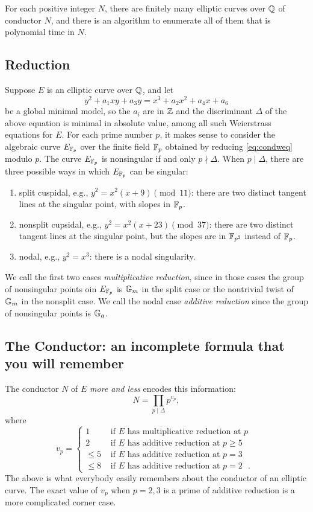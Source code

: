 \documentclass{book}
\begin{document}
\begin{theorem}
For each positive integer $N$,
there are finitely many elliptic curves over $\mathbb{Q}$
of conductor $N$, and there is an algorithm
to enumerate all of them that is polynomial
time in $N$.
\end{theorem}

\subsection{Reduction}
Suppose $E$ is an elliptic curve over $\mathbb{Q}$, and let
\begin{equation}\label{eq:condweq}
y^2 + a_1 xy + a_3 y = x^3 + a_2 x^2 + a_4 x + a_6
\end{equation}
be a global minimal model, so the $a_i$ are in $\mathbb{Z}$
and the discriminant $\Delta$ of the above equation is minimal
in absolute value, among all such Weierstrass equations for $E$.
For each prime number $p$, it makes sense to consider
the algebraic curve $E_{\mathbb{F}_p}$ over the finite field
$\mathbb{F}_p$ obtained by reducing \eqref{eq:condweq} modulo $p$.
The curve $E_{\mathbb{F}_p}$ is nonsingular if and only $p\nmid \Delta$.
When $p\mid \Delta$, there are three possible ways in which
$E_{\mathbb{F}_p}$ can be singular:
\begin{enumerate}
\item split cuspidal, e.g., $y^2=x^2(x+9)\pmod{11}$: there are two distinct
tangent lines at the singular point, with slopes in $\mathbb{F}_p$.
\item nonsplit cupsidal, e.g., $y^2=x^2(x+23) \pmod{37}$: there are two distinct tangent lines
at the singular point, but the slopes are in $\mathbb{F}_{p^2}$ instead
of $\mathbb{F}_p$.
\item nodal, e.g., $y^2=x^3$: there is a nodal singularity.
\end{enumerate}
We call the first two cases {\em multiplicative reduction}, since in those
cases the group of nonsingular points oin $E_{\mathbb{F}_p}$ is $\mathbb{G}_m$ in
the split case or the nontrivial twist of $\mathbb{G}_m$ in the nonsplit case.
We call the nodal case {\em additive reduction} since the group of nonsingular points is $\mathbb{G}_a$.

\subsection{The Conductor: an incomplete formula that you will remember}
The conductor $N$ of $E$ {\em more and less} encodes this information:
$$
N = \prod_{p\mid\Delta} p^{v_p},
$$
where
$$
v_p = \begin{cases}
 1 & \text{ if $E$ has multiplicative reduction at $p$ } \\
 2 & \text{ if $E$ has additive reduction at $p\geq 5$ } \\
 \leq 5 & \text{ if $E$ has additive reduction at $p=3$ }\\
 \leq 8 & \text{ if $E$ has additive reduction at $p=2$ }.
 \end{cases}
$$
The above is what everybody easily remembers about the conductor
of an elliptic curve.  The exact value of $v_p$ when $p=2,3$ is
a prime of additive reduction is a more complicated corner case.
\end{document}
